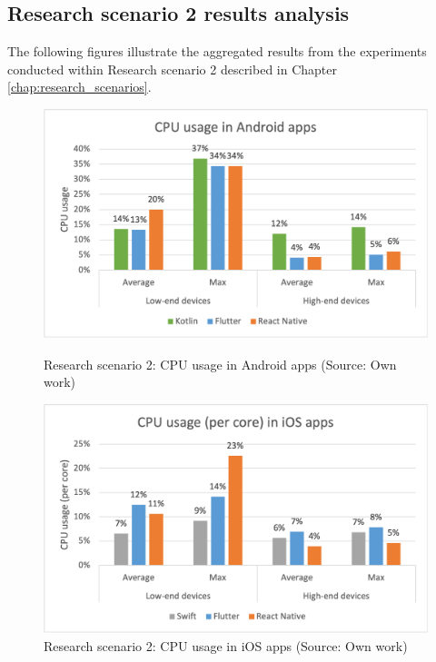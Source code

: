 
\subsection{Research scenario 2 results analysis}

The following figures illustrate the aggregated results from the experiments conducted within Research scenario 2 described in Chapter \ref{chap:research_scenarios}.

\begin{figure}[H]
    \begin{minipage}{.48\textwidth}
        \includegraphics[width=\textwidth]{img/scenario2_cpu_android}
        \caption{Research scenario 2: CPU usage in Android apps (Source: Own work)}
        \label{fig:s2_cpu_android}
    \end{minipage}
    \hfill
    \begin{minipage}{.48\textwidth}
        \includegraphics[width=\textwidth]{img/scenario2_cpu_ios}
        \caption{Research scenario 2: CPU usage in iOS apps (Source: Own work)}
        \label{fig:s2_cpu_ios}
    \end{minipage}
\end{figure}

